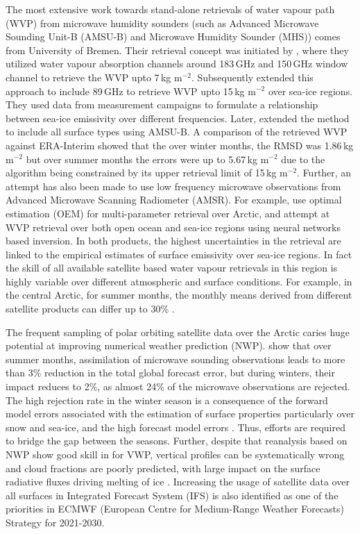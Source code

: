 \documentclass[12pt,oneside,a4paper]{article}
\begin{document}
The most extensive work towards stand-alone retrievals of water vapour path
(WVP) from microwave humidity sounders (such as Advanced Microwave Sounding
Unit-B (AMSU-B) and Microwave Humidity Sounder (MHS)) comes from University of
Bremen. Their retrieval concept was initiated by \citet{miao:2001:atmos}, where
they utilized water vapour absorption channels around 183\,GHz and 150\,GHz
window channel to retrieve the WVP upto 7\,kg m$^{-2}$. Subsequently
\citet{melsheimer:2008:impro} extended this approach to include 89\,GHz to
retrieve WVP upto 15\,kg m$^{-2}$ over sea-ice regions. They used data from
measurement campaigns to formulate a relationship between sea-ice emissivity
over different frequencies. Later, \citet{scarlat:2018:retri} extended the
method to include all surface types using AMSU-B. A comparison of the retrieved
WVP against ERA-Interim showed that the over winter months, the RMSD was
1.86\,kg m$^{-2}$ but over summer months the errors were up to 5.67\,kg
m$^{-2}$ due to the algorithm being constrained by its upper retrieval limit of
15\,kg m$^{-2}$. Further, an attempt has also been made to use low
frequency microwave observations from Advanced Microwave Scanning Radiometer
(AMSR). For example, \citet{scarlat:2017:exper} use optimal estimation (OEM)
for multi-parameter retrieval over Arctic, and \citet{zabolotskikh:2020:anadv}
attempt at WVP retrieval over both open ocean and sea-ice regions using neural
networks based inversion. In both products, the highest uncertainties in the
retrieval are linked to the empirical estimates of surface emissivity over
sea-ice regions. In fact the skill of all available satellite based water
vapour retrievals in this region is highly variable over different atmospheric
and surface conditions. For example, in the central Arctic, for summer months,
the monthly means derived from different satellite products can differ up to
30\% \citep{crewell:2021:asyst}.

The frequent sampling of polar orbiting satellite data over the Arctic caries
huge potential at improving numerical weather prediction (NWP).
\citet{lawrence:2019:usean} show that over summer months, assimilation of
microwave sounding observations leads to more than 3\% reduction in the total
global forecast error, but during winters, their impact reduces to 2\%, as
almost 24\% of the microwave observations are rejected. The high rejection rate
in the winter season is a consequence of the forward model errors associated
with the estimation of surface properties particularly over snow and sea-ice,
and the high forecast model errors \citep{bauer:2016:aspec}. Thus, efforts are
required to bridge the gap between the seasons. Further, despite that
reanalysis based on NWP show good skill in for VWP, vertical profiles can be
systematically wrong and cloud fractions are poorly predicted, with large
impact on the surface radiative fluxes driving melting of ice
\citep{graham:2019:evalu}. Increasing the usage of satellite data over all
surfaces in Integrated Forecast System (IFS) is also identified as one of the
priorities in ECMWF (European Centre for Medium-Range Weather Forecasts)
Strategy for 2021-2030.
\end{document}
